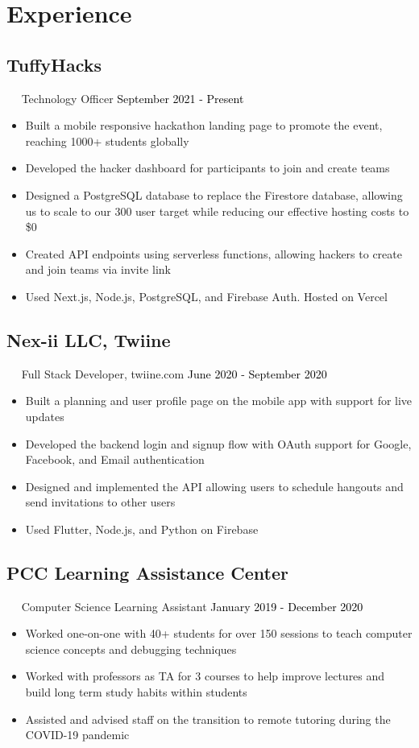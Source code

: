 \documentclass{article}
\newcommand{\resumesection}[3]{
    \subsection*{#1}
    \ 
    \ 
    \small
    \textcolor{csufgrey}{#2}
    \normalsize
    \hfill
    \textcolor{black}{#3}
    \normalsize
}
\begin{document}
\section*{Experience}
\resumesection{TuffyHacks}{Technology Officer}{September 2021 - Present}
\begin{itemize}
    \item Built a mobile responsive hackathon landing page to promote the event, reaching 1000+ students globally 
    \item Developed the hacker dashboard for participants to join and create teams
    \item Designed a PostgreSQL database to replace the Firestore database, allowing us to scale to our 300 user target while reducing our effective hosting costs to \$0
    \item Created API endpoints using serverless functions, allowing hackers to create and join teams via invite link
    \item Used Next.js, Node.js, PostgreSQL, and Firebase Auth. Hosted on Vercel
\end{itemize}
\resumesection{Nex-ii LLC, Twiine}{Full Stack Developer, twiine.com}{June 2020 - September 2020}
\begin{itemize}
    \item Built a planning and user profile page on the mobile app with support for live updates
    \item Developed the backend login and signup flow with OAuth support for Google, Facebook, and Email authentication
    \item Designed and implemented the API allowing users to schedule hangouts and send invitations to other users
    \item Used Flutter, Node.js, and Python on Firebase
\end{itemize}
\resumesection{PCC Learning Assistance Center}{Computer Science Learning Assistant}{January 2019 - December 2020}
\begin{itemize}
    \item Worked one-on-one with 40+ students for over 150 sessions to teach computer science concepts and debugging techniques
    \item Worked with professors as TA for 3 courses to help improve lectures and build long term study habits within students
    \item Assisted and advised staff on the transition to remote tutoring during the COVID-19 pandemic
\end{itemize}
\end{document}
